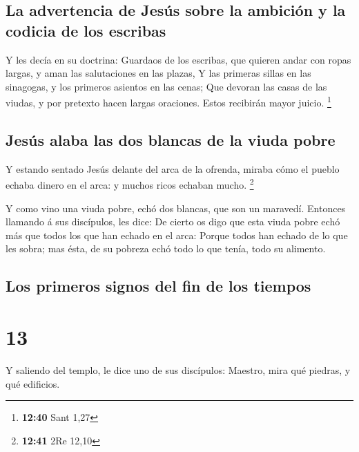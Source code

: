 \hypertarget{la-advertencia-de-jesuxfas-sobre-la-ambiciuxf3n-y-la-codicia-de-los-escribas}{%
\subsection{La advertencia de Jesús sobre la ambición y la codicia de
los
escribas}\label{la-advertencia-de-jesuxfas-sobre-la-ambiciuxf3n-y-la-codicia-de-los-escribas}}

 Y les decía en su doctrina: Guardaos de los escribas, que
quieren andar con ropas largas, y aman las salutaciones en las plazas,
 Y las primeras sillas en las sinagogas, y los primeros
asientos en las cenas;  Que devoran las casas de las
viudas, y por pretexto hacen largas oraciones. Estos recibirán mayor
juicio. \footnote{\textbf{12:40} Sant 1,27}

\hypertarget{jesuxfas-alaba-las-dos-blancas-de-la-viuda-pobre}{%
\subsection{Jesús alaba las dos blancas de la viuda
pobre}\label{jesuxfas-alaba-las-dos-blancas-de-la-viuda-pobre}}

 Y estando sentado Jesús delante del arca de la ofrenda,
miraba cómo el pueblo echaba dinero en el arca: y muchos ricos echaban
mucho. \footnote{\textbf{12:41} 2Re 12,10}

 Y como vino una viuda pobre, echó dos blancas, que son un
maravedí.  Entonces llamando á sus discípulos, les dice: De
cierto os digo que esta viuda pobre echó más que todos los que han
echado en el arca:  Porque todos han echado de lo que les
sobra; mas ésta, de su pobreza echó todo lo que tenía, todo su alimento.

\hypertarget{los-primeros-signos-del-fin-de-los-tiempos}{%
\subsection{Los primeros signos del fin de los
tiempos}\label{los-primeros-signos-del-fin-de-los-tiempos}}

\hypertarget{section-12}{%
\section{13}\label{section-12}}

 Y saliendo del templo, le dice uno de sus discípulos:
Maestro, mira qué piedras, y qué edificios.

